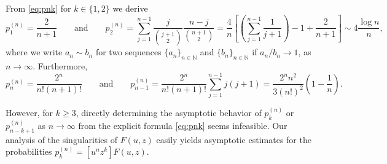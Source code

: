 \documentclass[11pt,a4paper]{article}
\numberwithin{equation}{section}
\def\NN{\mathbb{N}}
\begin{document}
From \eqref{eq:pnk} for $k\in\{1,2\}$ we derive
\begin{equation*}
    p_1^{(n)} = \frac{2}{n+1} \qquad \text{and} \qquad
    p_2^{(n)} = \sum_{j=1}^{n-1} \frac{j}{\binom{j+1}{2}} \frac{n-j}{\binom{n+1}{2}} = \frac{4}{n}\left[ \left( \sum_{j=1}^{n-1} \frac{1}{j+1}\right) - 1 + \frac{2}{n+1}\right] \sim 4\frac{\log n}{n},
\end{equation*}
where we write $a_n\sim b_n$ for two sequences $\{a_n\}_{n\in\NN}$ and $\{b_n\}_{n\in\NN}$ if $a_n/b_n\to 1$, as $n\to\infty$.
Furthermore, 
\begin{equation}\label{eqn:pnn1}
    p_n^{(n)} = \frac{2^n}{n!(n+1)!} \qquad \text{and}\qquad
    p_{n-1}^{(n)} = \frac{2^n}{n!(n+1)!} \sum_{j=1}^{n-1} j(j+1) = \frac{2^n n^2}{3 (n!)^2} \left(1-\frac{1}{n}\right).
\end{equation}

However, for $k\geq 3$, directly determining the asymptotic behavior of $p_k^{(n)}$ or $p_{n-k+1}^{(n)}$ as $n\to\infty$ from the explicit formula \eqref{eq:pnk} seems infeasible. Our analysis of the singularities of $F(u,z)$ easily yields asymptotic estimates for the probabilities $p_k^{(n)} = [u^n z^k] F(u,z)$.
\end{document}
